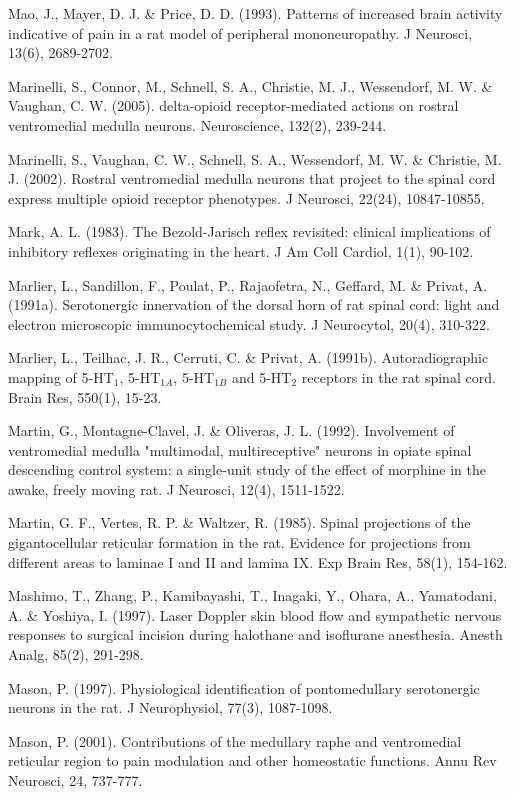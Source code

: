 \documentclass[a4paper,12pt,twoside]{report}
\begin{document}
\begin{singlespacing}
\begin{footnotesize}
Mao, J., Mayer, D. J. \& Price, D. D. (1993). Patterns of increased brain activity indicative of pain in a rat model of peripheral mononeuropathy. J Neurosci, 13(6), 2689-2702.

Marinelli, S., Connor, M., Schnell, S. A., Christie, M. J., Wessendorf, M. W. \& Vaughan, C. W. (2005). delta-opioid receptor-mediated actions on rostral ventromedial medulla neurons. Neuroscience, 132(2), 239-244.

Marinelli, S., Vaughan, C. W., Schnell, S. A., Wessendorf, M. W. \& Christie, M. J. (2002). Rostral ventromedial medulla neurons that project to the spinal cord express multiple opioid receptor phenotypes. J Neurosci, 22(24), 10847-10855.

Mark, A. L. (1983). The Bezold-Jarisch reflex revisited: clinical implications of inhibitory reflexes originating in the heart. J Am Coll Cardiol, 1(1), 90-102.

Marlier, L., Sandillon, F., Poulat, P., Rajaofetra, N., Geffard, M. \& Privat, A. (1991a). Serotonergic innervation of the dorsal horn of rat spinal cord: light and electron microscopic immunocytochemical study. J Neurocytol, 20(4), 310-322.

Marlier, L., Teilhac, J. R., Cerruti, C. \& Privat, A. (1991b). Autoradiographic mapping of 5-HT$_{1}$, 5-HT$_{1A}$, 5-HT$_{1B}$ and 5-HT$_{2}$ receptors in the rat spinal cord. Brain Res, 550(1), 15-23.

Martin, G., Montagne-Clavel, J. \& Oliveras, J. L. (1992). Involvement of ventromedial medulla "multimodal, multireceptive" neurons in opiate spinal descending control system: a single-unit study of the effect of morphine in the awake, freely moving rat. J Neurosci, 12(4), 1511-1522.

Martin, G. F., Vertes, R. P. \& Waltzer, R. (1985). Spinal projections of the gigantocellular reticular formation in the rat. Evidence for projections from different areas to laminae I and II and lamina IX. Exp Brain Res, 58(1), 154-162.

Mashimo, T., Zhang, P., Kamibayashi, T., Inagaki, Y., Ohara, A., Yamatodani, A. \& Yoshiya, I. (1997). Laser Doppler skin blood flow and sympathetic nervous responses to surgical incision during halothane and isoflurane anesthesia. Anesth Analg, 85(2), 291-298.

Mason, P. (1997). Physiological identification of pontomedullary serotonergic neurons in the rat. J Neurophysiol, 77(3), 1087-1098.

Mason, P. (2001). Contributions of the medullary raphe and ventromedial reticular region to pain modulation and other homeostatic functions. Annu Rev Neurosci, 24, 737-777.


\end{footnotesize}
\end{singlespacing}
\end{document}
